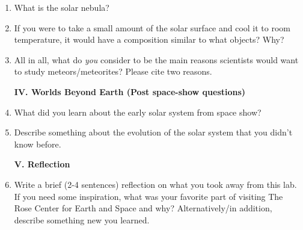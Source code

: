 \documentclass[10pt]{article}%
\begin{document}
\begin{flushleft}
\begin{enumerate}
\item What is the solar nebula? 

\vspace{0.3cm}

\item If you were to take a small amount of the solar surface and cool it to
room temperature, it would have a composition similar to what objects?  Why?

\vspace{0.3cm}

\item All in all, what do \emph{you} consider to be the main reasons scientists
would want to study meteors/meteorites?  Please cite two reasons.

\vspace{0.3cm}

\begin{center}
\textbf{IV. Worlds Beyond Earth (Post space-show questions)}
\end{center}

\vspace{0.3cm}

\item What did you learn about the early solar system from space show? 

\vspace{0.3cm}

\item Describe something about the evolution of the solar system that you didn't know before.

\vspace{0.3cm}

\begin{center}
\textbf{V. Reflection}
\end{center}

\vspace{0.3cm}

\item Write a brief (2-4 sentences) reflection on what you took away from this lab. If you need some inspiration, what was your favorite part of visiting The Rose Center for Earth and Space and why? Alternatively/in addition, describe something new you learned.

\end{enumerate}
\end{flushleft}
\end{document}
